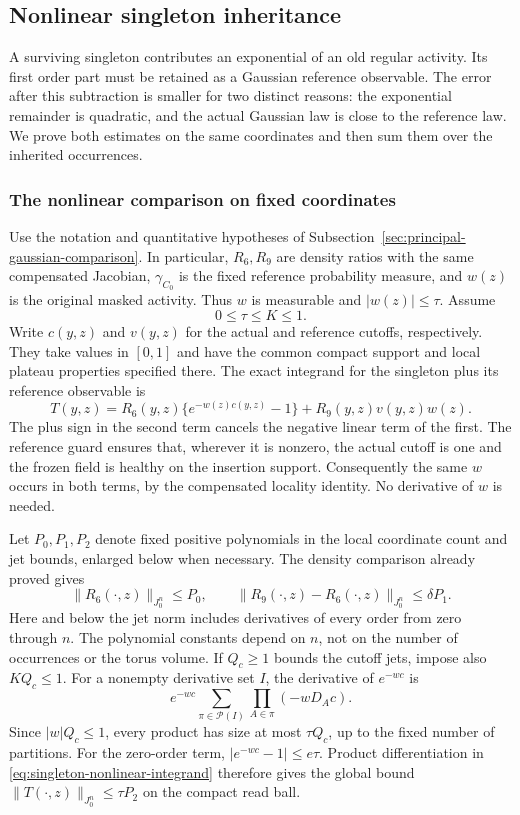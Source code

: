 \subsection{Nonlinear singleton inheritance}
\label{sec:nonlinear-singleton-inheritance}
A surviving singleton contributes an exponential of an old regular
activity. Its first order part must be retained as a Gaussian reference
observable. The error after this subtraction is smaller for two distinct
reasons: the exponential remainder is quadratic, and the actual Gaussian
law is close to the reference law. We prove both estimates on the same
coordinates and then sum them over the inherited occurrences.

\subsubsection{The nonlinear comparison on fixed coordinates}
Use the notation and quantitative hypotheses of
Subsection~\ref{sec:principal-gaussian-comparison}. In particular, $R_6,R_9$
are density ratios with the same compensated Jacobian, $\gamma_{C_0}$
is the fixed reference probability measure, and $w(z)$ is the original
masked activity. Thus $w$ is measurable and $|w(z)|\le\tau$. Assume
\[
 0\le\tau\le K\le1.
\]
Write $c(y,z)$ and $v(y,z)$ for the actual and reference cutoffs,
respectively. They take values in $[0,1]$ and have the common compact
support and local plateau properties specified there. The exact integrand
for the singleton plus its reference observable is
\begin{equation}\label{eq:singleton-nonlinear-integrand}
 T(y,z)=R_6(y,z)\{e^{-w(z)c(y,z)}-1\}
                         +R_9(y,z)v(y,z)w(z).
\end{equation}
The plus sign in the second term cancels the negative linear term of
the first. The reference guard ensures that, wherever it is nonzero,
the actual cutoff is one and the frozen field is healthy on the
insertion support. Consequently the same $w$ occurs in both terms,
by the compensated locality identity. No derivative of $w$ is needed.

Let $P_0,P_1,P_2$ denote fixed positive polynomials in the local
coordinate count and jet bounds, enlarged below when necessary. The
density comparison already proved gives
\[
 \|R_6(\cdot,z)\|_{J^n_0}\le P_0,
 \qquad
 \|R_9(\cdot,z)-R_6(\cdot,z)\|_{J^n_0}\le\delta P_1.
\]
Here and below the jet norm includes derivatives of every order from
zero through $n$. The polynomial constants depend on $n$, not on the
number of occurrences or the torus volume. If $Q_c\ge1$ bounds the
cutoff jets, impose also $KQ_c\le1$. For a nonempty derivative set $I$,
the derivative of $e^{-wc}$ is
\[
 e^{-wc}\sum_{\pi\in\mathcal P(I)}
                  \prod_{A\in\pi}(-w D_Ac).
\]
Since $|w|Q_c\le1$, every product has size at most $\tau Q_c$,
up to the fixed number of partitions. For the zero-order term,
$|e^{-wc}-1|\le e\tau$. Product differentiation in
\eqref{eq:singleton-nonlinear-integrand} therefore gives the global
bound $\|T(\cdot,z)\|_{J^n_0}\le\tau P_2$ on the compact read ball.

